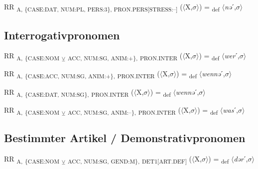 {\begin{exe}
 RR \textsubscript{A, \{CASE:DAT, NUM:PL, PERS:3\}, PRON.PERS[STRESS:–]} ($\langle$X,$\sigma $$\rangle$) = \textsubscript{def} $\langle$\textit{nə}ˊ,$\sigma $$\rangle$
\end{exe}

\subsection{Interrogativpronomen}

\begin{exe}
 RR \textsubscript{A,} \textsubscript{\{CASE:NOM} \textsubscript{${\veebar}$}\textsubscript{ ACC, NUM:SG, ANIM:+\},} \textsubscript{PRON.INTER} ($\langle$X,$\sigma $$\rangle$) = \textsubscript{def} $\langle$\textit{wer}ˊ,$\sigma $$\rangle$
\end{exe}

\begin{exe}
 RR \textsubscript{A,} \textsubscript{\{CASE:ACC, NUM:SG, ANIM:+\},} \textsubscript{PRON.INTER} ($\langle$X,$\sigma $$\rangle$) = \textsubscript{def} $\langle$\textit{wennə}ˊ,$\sigma $$\rangle$
\end{exe}

\begin{exe}
 RR \textsubscript{A,} \textsubscript{\{CASE:DAT, NUM:SG\},} \textsubscript{PRON.INTER} ($\langle$X,$\sigma $$\rangle$) = \textsubscript{def} $\langle$\textit{wennə}ˊ,$\sigma $$\rangle$
\end{exe}

\begin{exe}
 RR \textsubscript{A,} \textsubscript{\{CASE:NOM} \textsubscript{${\veebar}$}\textsubscript{ ACC, NUM:SG, ANIM:–\},} \textsubscript{PRON.INTER} ($\langle$X,$\sigma $$\rangle$) = \textsubscript{def} $\langle$\textit{was}ˊ,$\sigma $$\rangle$
\end{exe}

\subsection{Bestimmter Artikel / Demonstrativpronomen}


\begin{exe}
 RR \textsubscript{A,} \textsubscript{\{CASE:NOM} \textsubscript{${\veebar}$}\textsubscript{ ACC, NUM:SG, GEND:M\},} \textsubscript{DET1[ART.DEF]} ($\langle$X,$\sigma $$\rangle$) = \textsubscript{def} $\langle$\textit{dər}ˊ,$\sigma $$\rangle$
\end{exe}

}
